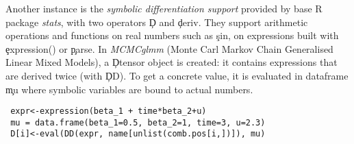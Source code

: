 \documentclass[review,screen,acmsmall,anonymous=true]{acmart}
\begin{document}
Another instance is the \emph{symbolic differentiation support} provided by base R package \emph{stats}, with two operators \c{D} and \c{deriv}. They support arithmetic operations and functions on real numbers such as \c{sin}, on expressions built with \c{expression()} or \c{parse}.
In \emph{MCMCglmm} (Monte Carl Markov Chain Generalised Linear Mixed Models), a \c{Dtensor} object is created: it contains expressions that are derived twice (with \c{DD}). To get a concrete value, it is evaluated in  dataframe \c{mu} where symbolic variables are bound to actual numbers.
\begin{lstlisting}
 expr<-expression(beta_1 + time*beta_2+u)
 mu = data.frame(beta_1=0.5, beta_2=1, time=3, u=2.3)
 D[i]<-eval(DD(expr, name[unlist(comb.pos[i,])]), mu)
\end{lstlisting}




\end{document}
